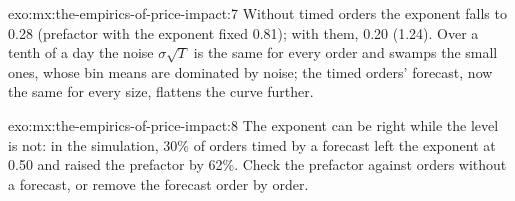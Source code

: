 \begin{solution}{exo:mx:the-empirics-of-price-impact:7}
Without timed orders the exponent falls to 0.28 (prefactor with the exponent fixed 0.81); with them, 0.20 (1.24). Over a tenth of a day the noise
$\sigma\sqrt T$ is the same for every order and swamps the small ones, whose bin means are dominated by noise; the timed orders' forecast, now the same
for every size, flattens the curve further.
\end{solution}

\begin{solution}{exo:mx:the-empirics-of-price-impact:8}
The exponent can be right while the level is not: in the simulation, 30\% of orders timed by a forecast left the exponent at 0.50 and raised the prefactor
by 62\%. Check the prefactor against orders without a forecast, or remove the forecast order by order.
\end{solution}


